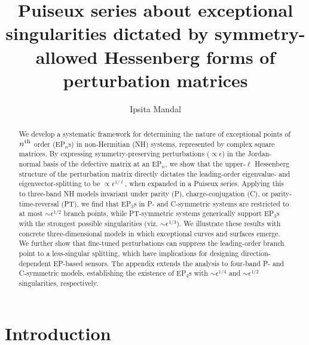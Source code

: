 \documentclass[aps, prb, onecolumn, nofootinbib, citeautoscript, 10pt]{revtex4-2}
\begin{document}
\title{Puiseux series about exceptional singularities dictated by symmetry-allowed Hessenberg forms of perturbation matrices}

\author{Ipsita Mandal}






\begin{abstract}
We develop a systematic framework for determining the nature of exceptional points of $n^{\rm th}$ order (EP$_n$s) in non-Hermitian (NH) systems, represented by complex square matrices. By expressing symmetry-preserving perturbations ($\propto \epsilon$) in the Jordan-normal basis of the defective matrix at an EP$_n$, we show that the upper-$\ell$ Hessenberg structure of the perturbation matrix directly dictates the leading-order eigenvalue- and eigenvector-splitting to be $\propto  \epsilon^{1/\ell}$, when expanded in a Puiseux series. Applying this to three-band NH models invariant under parity (P), charge-conjugation (C), or parity-time-reversal (PT), we find that EP$_3$s in P- and C-symmetric systems are restricted to at most $\sim  \epsilon^{1/2}$ branch points, while PT-symmetric systems generically support EP$_3$s with the strongest possible singularities (viz. $\sim \epsilon^{1/3}$). We illustrate these results with concrete three-dimensional models in which exceptional curves and surfaces emerge. We further show that fine-tuned perturbations can suppress the leading-order branch point to a less-singular splitting, which have implications for designing direction-dependent EP-based sensors. The appendix extends the analysis to four-band P- and C-symmetric models, establishing the existence of EP$_4$s with $\sim \epsilon^{1/4}$ and  $\sim \epsilon^{1/2}$ singularities, respectively.
\end{abstract}


\maketitle

\tableofcontents

\section{Introduction}
\end{document}

